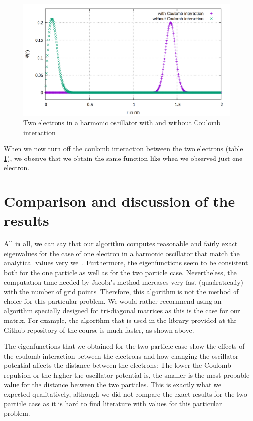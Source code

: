 \documentclass[10pt,a4paper]{article}
\begin{document}
\begin{figure}[h]
	\includegraphics[scale = 0.25]{k1_comparison_2El_n500.png}
	\centering
	\caption{Two electrons in a harmonic oscillator with and without Coulomb interaction}
	\label{plot2elrcoulomb}
\end{figure}

When we now turn off the coulomb interaction between the two electrons (table \ref{plot2elrcoulomb}), we observe that we obtain the same function like when we observed just one electron.
\clearpage
\section{Comparison and discussion of the results} \label{Comparison and results}
All in all, we can say that our algorithm computes reasonable and fairly exact eigenvalues for the case of one electron in a harmonic oscillator that match the analytical values very well. Furthermore, the eigenfunctions seem to be consistent both for the one particle as well as for the two particle case. Nevertheless, the computation time needed by Jacobi's method increases very fast (quadratically) with the number of grid points. Therefore, this algorithm is not the method of choice for this particular problem. We would rather recommend using an algorithm specially designed for tri-diagonal matrices as this is the case for our matrix. For example, the algorithm that is used in the library provided at the Github repository of the course is much faster, as shown above.

The eigenfunctions that we obtained for the two particle case show the effects of the coulomb interaction between the electrons and how changing the oscillator potential affects the distance between the electrons: The lower the Coulomb repulsion or the higher the oscillator potential is, the smaller is the most probable value for the distance between the two particles. This is exactly what we expected qualitatively, although we did not compare the exact results for the two particle case as it is hard to find literature with values for this particular problem.
\end{document}
